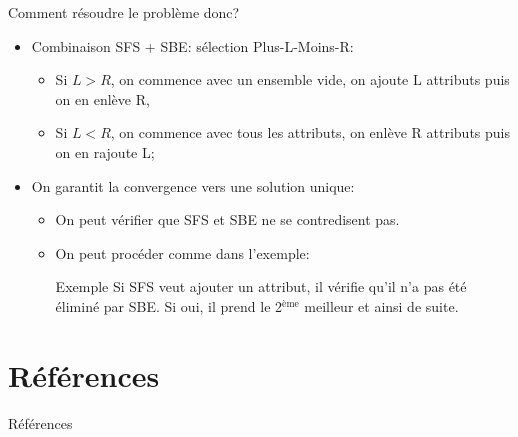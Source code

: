 \documentclass[9pt]{beamer}
\begin{document}
	\begin{frame}{Comment résoudre le problème donc?}
		\begin{itemize}
			\item<1-> Combinaison SFS + SBE\@: sélection Plus-L-Moins-R\@:
			\begin{itemize}
				\item Si $L > R$, on commence avec un ensemble vide, on ajoute L attributs puis on en enlève R\@,
				\item Si $L < R$, on commence avec tous les attributs, on enlève R attributs puis on en rajoute L\@;
			\end{itemize}
			\item<2-> On garantit la convergence vers une solution unique:
			\begin{itemize}
				\item On peut vérifier que SFS et SBE ne se contredisent pas.
				\item On peut procéder comme dans l'exemple:
				\begin{block}{Exemple}
					Si SFS veut ajouter un attribut, il vérifie qu'il n'a pas été éliminé par SBE\@. Si oui, il prend le 2$^{\text{ème}}$ meilleur et ainsi de suite.
				\end{block}
			\end{itemize}
		\end{itemize}
	\end{frame}

	\section*{Références}
	\begin{frame}[allowframebreaks]{Références}
		\nocite{sklearn_api}
		\nocite{camps2009kernel}
		\nocite{CC01a}
		
		
	\end{frame}
\end{document}
